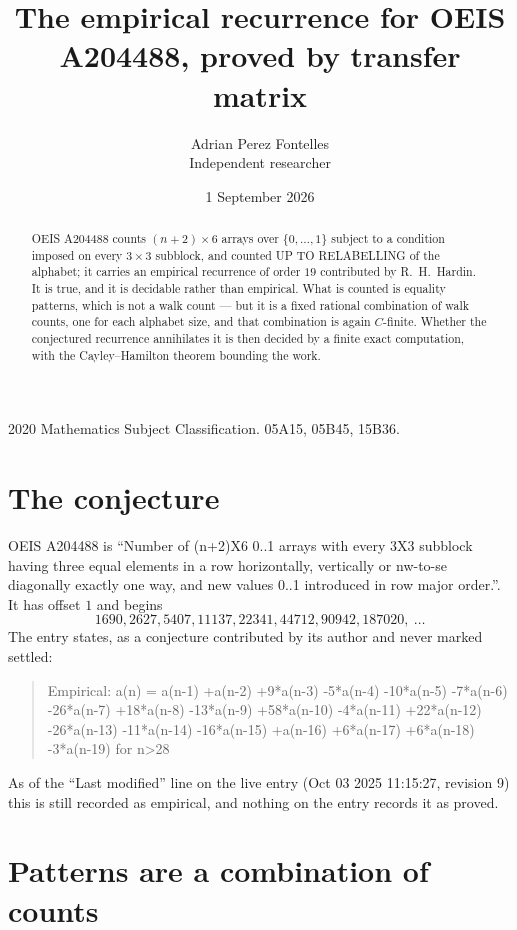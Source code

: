\documentclass[11pt,a4paper]{article}
\title{The empirical recurrence for OEIS A204488, proved by transfer matrix}
\author{Adrian Perez Fontelles\\ \small Independent researcher}
\date{1 September 2026}
\theoremstyle{plain}
\theoremstyle{definition}
\begin{document}
\maketitle

\begin{abstract}
OEIS A204488 counts $(n+2)\times6$ arrays over $\{0,\dots,1\}$ subject to a condition imposed on
every $3\times3$ subblock, and counted UP TO RELABELLING of the
alphabet; it carries an empirical recurrence of order $19$ contributed by
R.~H.~Hardin. It is true, and it is decidable rather than empirical. What is counted is
equality patterns, which is not a walk count --- but it is a fixed rational combination of
walk counts, one for each alphabet size, and that combination is again $C$-finite. Whether the
conjectured recurrence annihilates it is then decided by a finite exact computation, with the
Cayley--Hamilton theorem bounding the work.
\end{abstract}

\noindent\small 2020 Mathematics Subject Classification. 05A15, 05B45, 15B36.\normalsize

\section{The conjecture}

OEIS A204488 is ``Number of (n+2)X6 0..1 arrays with every 3X3 subblock having three equal elements in a row horizontally, vertically or nw-to-se diagonally exactly one way, and new values 0..1 introduced in row major order.''. It has offset $1$ and begins
\[
1690, 2627, 5407, 11137, 22341, 44712, 90942, 187020,\ \dots
\]
The entry states, as a conjecture contributed by its author and never marked settled:
\begin{quote}
Empirical: a(n) = a(n-1) +a(n-2) +9*a(n-3) -5*a(n-4) -10*a(n-5) -7*a(n-6) -26*a(n-7) +18*a(n-8) -13*a(n-9) +58*a(n-10) -4*a(n-11) +22*a(n-12) -26*a(n-13) -11*a(n-14) -16*a(n-15) +a(n-16) +6*a(n-17) +6*a(n-18) -3*a(n-19) for n>28
\end{quote}
As of the ``Last modified'' line on the live entry (Oct 03 2025 11:15:27, revision 9) this is still
recorded as empirical, and nothing on the entry records it as proved.

\section{Patterns are a combination of counts}
\end{document}

